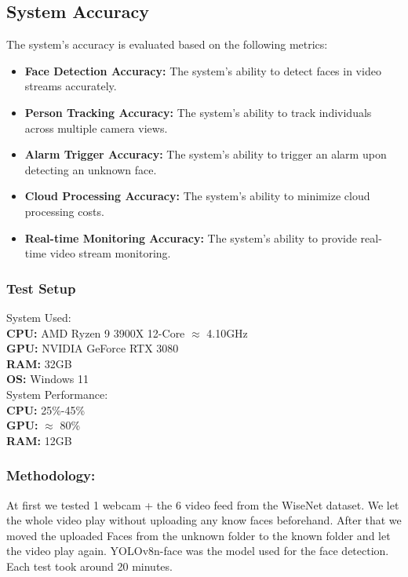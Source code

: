 \documentclass[conference]{IEEEtran}
\begin{document}
\subsection{System Accuracy}
The system's accuracy is evaluated based on the following metrics:
\begin{itemize}
      \item \textbf{Face Detection Accuracy:} The system's ability to detect faces in video streams accurately.
      \item \textbf{Person Tracking Accuracy:} The system's ability to track individuals across multiple camera views.
      \item \textbf{Alarm Trigger Accuracy:} The system's ability to trigger an alarm upon detecting an unknown face.
      \item \textbf{Cloud Processing Accuracy:} The system's ability to minimize cloud processing costs.
      \item \textbf{Real-time Monitoring Accuracy:} The system's ability to provide real-time video stream monitoring.
\end{itemize}

\subsubsection{Test Setup}
System Used:\\
\hspace*{20pt} \textbf{CPU:} AMD Ryzen 9 3900X 12-Core $\approx$ 4.10GHz\\
\hspace*{20pt} \textbf{GPU:} NVIDIA GeForce RTX 3080\\
\hspace*{20pt} \textbf{RAM:} 32GB\\
\hspace*{20pt} \textbf{OS:} Windows 11\\
System Performance:\\
\hspace*{20pt} \textbf{CPU:} 25\%-45\%\\
\hspace*{20pt} \textbf{GPU:} $\approx$ 80\%\\
\hspace*{20pt} \textbf{RAM:} 12GB
\subsubsection{Methodology:}
At first we tested 1 webcam + the 6 video feed from the WiseNet dataset. We let the whole video play without uploading any know faces beforehand.
After that we moved the uploaded Faces from the unknown folder to the known folder and let the video play again.
YOLOv8n-face was the model used for the face detection. Each test took around 20 minutes.
\end{document}
